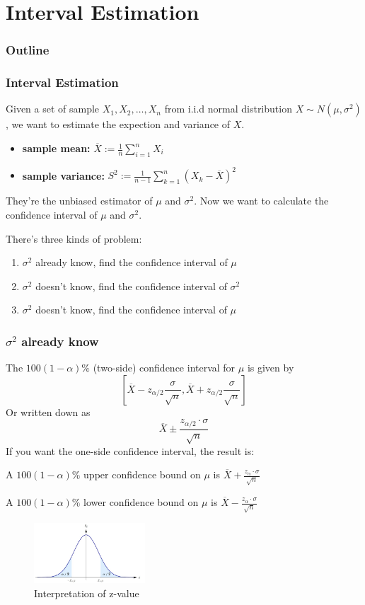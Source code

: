 \documentclass{beamer}
\begin{document}
\section{Interval Estimation}
\begin{frame}
    \frametitle{Outline}
    \tableofcontents[currentsection]
\end{frame}
\begin{frame}
    \frametitle{Interval Estimation}
    Given a set of sample $X_1, X_2, \dots , X_n $ from i.i.d normal distribution $X\sim N(\mu, \sigma^2)$, we want to estimate the expection and variance of $X$.\par
    \begin{itemize}
        \item \textbf{sample mean:} $\overline{X}:=\frac{1}{n}\sum\limits_{i=1}^{n}X_i$
        \item \textbf{sample variance:} $S^2:=\frac{1}{n-1}\sum\limits_{k=1}^{n}(X_k-\overline{X})^2$
    \end{itemize}
    They're the unbiased estimator of $\mu$ and $\sigma^2$. Now we want to calculate the confidence interval of $\mu$ and $\sigma^2$.\par
    There's three kinds of problem:
    \begin{enumerate}
        \item $\sigma^2$ already know, find the confidence interval of $\mu$
        \item $\sigma^2$ doesn't know, find the confidence interval of $\sigma^2$
        \item $\sigma^2$ doesn't know, find the confidence interval of $\mu$
    \end{enumerate}
    

\end{frame}

\begin{frame}
    \frametitle{$\sigma^2$ already know}
    The $100(1-\alpha)\%$ (two-side) confidence interval for $\mu$ is given by
    \[[\overline{X} -z_{\alpha/2} \frac{\sigma}{\sqrt{n}},\overline{X}+ z_{\alpha/2} \frac{\sigma}{\sqrt{n}}]\]
    Or written down as
    \[\overline{X}\pm\frac{z_{\alpha/2}\cdot\sigma}{\sqrt{n}}\]
    If you want the one-side confidence interval, the result is: \par
    A $100(1-\alpha)\%$ upper confidence bound on $\mu$ is $\overline{X}+\frac{z_{\alpha}\cdot\sigma}{\sqrt{n}}$

    A $100(1-\alpha)\%$ lower confidence bound on $\mu$ is $\overline{X}-\frac{z_{\alpha}\cdot\sigma}{\sqrt{n}}$
    \begin{figure}[H]
        \centering
        \includegraphics[width=0.37\textwidth,height=0.17\textwidth]{z_value.jpg}
        \caption{Interpretation of z-value}
    \end{figure}\par
    

\end{frame}
\end{document}
